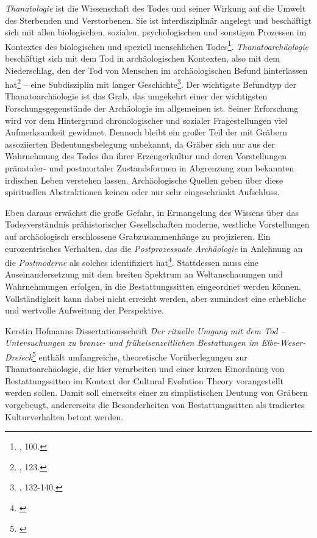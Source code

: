 \documentclass[openany,twoside,twocolumn]{book}
\let\rmarkdownfootnote\footnote%
\def\footnote{\protect\rmarkdownfootnote}
\begin{document}
\emph{Thanatologie} ist die Wissenschaft des Todes und seiner Wirkung
auf die Umwelt des Sterbenden und Verstorbenen. Sie ist interdisziplinär
angelegt und beschäftigt sich mit allen biologischen, sozialen,
psychologischen und sonstigen Prozessen im Kontextes des biologischen
und speziell menschlichen Todes\footnote{\textcite{hofmann_rituelle_2008},
  100.}. \emph{Thanatoarchäologie} beschäftigt sich mit dem Tod in
archäologischen Kontexten, also mit dem Niederschlag, den der Tod von
Menschen im archäologischen Befund hinterlassen hat\footnote{\textcite{hofmann_rituelle_2008},
  123.} -- eine Subdisziplin mit langer Geschichte\footnote{\textcite{hofmann_rituelle_2008},
  132-140.}. Der wichtigste Befundtyp der Thanatoarchäologie ist das
Grab, das umgekehrt einer der wichtigsten Forschungsgegenstände der
Archäologie im allgemeinen ist. Seiner Erforschung wird vor dem
Hintergrund chronologischer und sozialer Fragestellungen viel
Aufmerksamkeit gewidmet. Dennoch bleibt ein großer Teil der mit Gräbern
assoziierten Bedeutungsbelegung unbekannt, da Gräber sich nur aus der
Wahrnehmung des Todes ihn ihrer Erzeugerkultur und deren Vorstellungen
pränataler- und postmortaler Zustandsformen in Abgrenzung zum bekannten
irdischen Leben verstehen lassen. Archäologische Quellen geben über
diese spirituellen Abstraktionen keinen oder nur sehr eingeschränkt
Aufschluss.

Eben daraus erwächst die große Gefahr, in Ermangelung des Wissens über
das Todesverständnis prähistorischer Gesellschaften moderne, westliche
Vorstellungen auf archäologisch erschlossene Grabzusammenhänge zu
projizieren. Ein eurozentrisches Verhalten, das die
\emph{Postprozessuale Archäologie} in Anlehnung an die
\emph{Postmoderne} als solches identifiziert hat\footnote{\textcite{atalay_indigenous_2006}}.
Stattdessen muss eine Auseinandersetzung mit dem breiten Spektrum an
Weltanschauungen und Wahrnehmungen erfolgen, in die Bestattungssitten
eingeordnet werden können. Vollständigkeit kann dabei nicht erreicht
werden, aber zumindest eine erhebliche und wertvolle Aufweitung der
Perspektive.

Kerstin Hofmanns Dissertationsschrift \emph{Der rituelle Umgang mit dem
Tod -- Untersuchungen zu bronze- und früheisenzeitlichen Bestattungen im
Elbe-Weser-Dreieck}\footnote{\textcite{hofmann_rituelle_2008}} enthält
umfangreiche, theoretische Vorüberlegungen zur Thanatoarchäologie, die
hier verarbeiten und einer kurzen Einordnung von Bestattungssitten im
Kontext der Cultural Evolution Theory vorangestellt werden sollen. Damit
soll einerseits einer zu simplistischen Deutung von Gräbern vorgebeugt,
andererseits die Besonderheiten von Bestattungssitten als tradiertes
Kulturverhalten betont werden.
\end{document}
